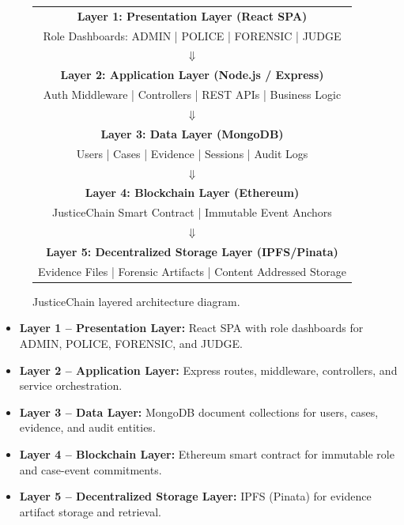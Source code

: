 \documentclass[conference]{IEEEtran}
\begin{document}
\begin{figure}[!t]
\centering
\footnotesize
\begin{tabular}{|c|}
\hline
\textbf{Layer 1: Presentation Layer (React SPA)} \\
Role Dashboards: ADMIN | POLICE | FORENSIC | JUDGE \\
\hline
\multicolumn{1}{c}{$\Downarrow$} \\
\hline
\textbf{Layer 2: Application Layer (Node.js / Express)} \\
Auth Middleware | Controllers | REST APIs | Business Logic \\
\hline
\multicolumn{1}{c}{$\Downarrow$} \\
\hline
\textbf{Layer 3: Data Layer (MongoDB)} \\
Users | Cases | Evidence | Sessions | Audit Logs \\
\hline
\multicolumn{1}{c}{$\Downarrow$} \\
\hline
\textbf{Layer 4: Blockchain Layer (Ethereum)} \\
JusticeChain Smart Contract | Immutable Event Anchors \\
\hline
\multicolumn{1}{c}{$\Downarrow$} \\
\hline
\textbf{Layer 5: Decentralized Storage Layer (IPFS/Pinata)} \\
Evidence Files | Forensic Artifacts | Content Addressed Storage \\
\hline
\end{tabular}
\caption{JusticeChain layered architecture diagram.}
\label{fig:arch}
\end{figure}

\begin{itemize}
    \item \textbf{Layer 1 -- Presentation Layer:} React SPA with role dashboards for ADMIN, POLICE, FORENSIC, and JUDGE.
    \item \textbf{Layer 2 -- Application Layer:} Express routes, middleware, controllers, and service orchestration.
    \item \textbf{Layer 3 -- Data Layer:} MongoDB document collections for users, cases, evidence, and audit entities.
    \item \textbf{Layer 4 -- Blockchain Layer:} Ethereum smart contract for immutable role and case-event commitments.
    \item \textbf{Layer 5 -- Decentralized Storage Layer:} IPFS (Pinata) for evidence artifact storage and retrieval.
\end{itemize}
\end{document}
